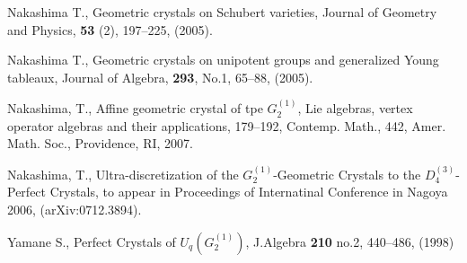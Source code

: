\begin{thebibliography}{A}
 Nakashima T.,
Geometric crystals on Schubert varieties, 
Journal of Geometry and Physics, 
{\bf 53} (2), 197--225, (2005).

 Nakashima T., 
Geometric crystals on unipotent groups and
generalized Young tableaux, 
Journal of Algebra, {\bf 293}, No.1, 65--88, (2005).

 Nakashima, T.,
Affine geometric crystal of tpe ${G^{(1)}_{2}}$, 
Lie algebras, vertex operator algebras 
and their applications, 179--192,
Contemp. Math., 442, Amer. Math. Soc., 
Providence, RI, 2007. 

 Nakashima, T.,
Ultra-discretization 
of the $G^{(1)}_2$-Geometric Crystals to the
$D^{(3)}_4$-Perfect Crystals, to appear in Proceedings of 
Internatinal Conference in Nagoya 2006,
(arXiv:0712.3894).

 Yamane S., Perfect Crystals of 
$U_q({G^{(1)}_{2}})$,
J.Algebra {\bf 210} no.2, 440--486, (1998)
\end{thebibliography}




